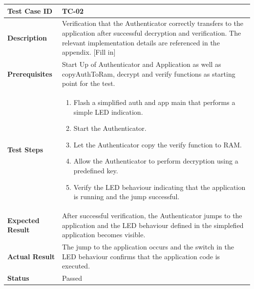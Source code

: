 \begin{table}[H]
\centering
\begin{tabular}{|p{3cm}|p{12cm}|}
\hline
\textbf{Test Case ID} & TC-02 \\ \hline
\textbf{Description} & Verification that the Authenticator correctly transfers to the application after successful decryption and verification. The relevant implementation details are referenced in the appendix. [Fill in]\\ \hline
\textbf{Prerequisites} & Start Up of Authenticator and Application as well as copyAuthToRam, decrypt and verify functions as starting point for the test. \\ \hline
\textbf{Test Steps} &
\begin{enumerate}
\item Flash a simplified auth and app main that performs a simple LED indication.
\item Start the Authenticator.
\item Let the Authenticator copy the verify function to RAM.
\item Allow the Authenticator to perform decryption using a predefined key.
\item Verify the LED behaviour indicating that the application is running and the jump successful.
\end{enumerate}
\\ \hline
\textbf{Expected Result} & After successful verification, the Authenticator jumps to the application and the LED behaviour defined in the simplefied application becomes visible. \\ \hline
\textbf{Actual Result} & The jump to the application occurs and the switch in the LED behaviour confirms that the application code is executed. \\ \hline
\textbf{Status} & \textcolor{green!60!black}{Passed} \\ \hline
\end{tabular}
\end{table}

